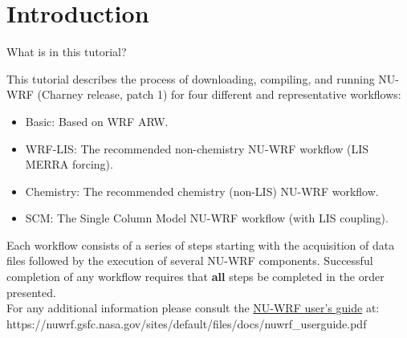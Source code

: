 \begin{frame}
\maketitle
\end{frame}

\section{Introduction}

\begin{frame}{What is in this tutorial?}

\footnotesize{
This tutorial  describes the process of downloading, compiling, and running NU-WRF (Charney release, patch 1) for four different and representative workflows:
\begin{itemize}
     \item Basic: Based on WRF ARW.
     \item WRF-LIS: The recommended non-chemistry NU-WRF workflow (LIS MERRA forcing).
     \item Chemistry: The recommended chemistry (non-LIS) NU-WRF workflow.
     \item SCM: The Single Column Model NU-WRF workflow (with LIS coupling).
\end{itemize}
Each workflow consists of a series of steps starting with the acquisition of data files followed by the execution of several NU-WRF components. Successful completion of any workflow requires that \textbf{all} steps be completed in the order presented.
\mbox{}\\
For any additional information please consult the \href{https://nuwrf.gsfc.nasa.gov/sites/default/files/docs/nuwrf_userguide.pdf}{NU-WRF user's guide} at: https://nuwrf.gsfc.nasa.gov/sites/default/files/docs/nuwrf\_userguide.pdf
}

\end{frame}

